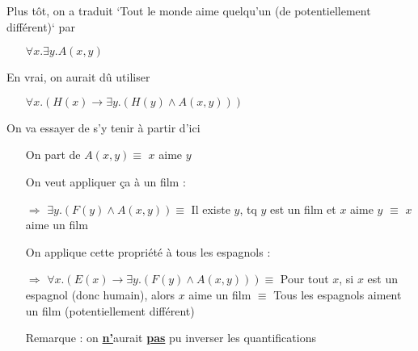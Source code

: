 	
\begin{frame}

Plus tôt, on a traduit `Tout le monde aime quelqu'un (de potentiellement différent)` par 

\begin{itemize}
\item[] $\forall x. \exists y. A(x,y)$\pause
\end{itemize}
\vspace{1mm}
En vrai, on aurait dû utiliser 
\begin{itemize}
\item[] $\forall x. (H(x) \rightarrow \exists y. (H(y) \wedge A(x,y)))$\pause
\end{itemize}
\vspace{3mm}
On va essayer de s'y tenir à partir d'ici

\end{frame}
	
	
\begin{frame}

\pause
{}\pause\newline


\begin{itemize}
\item[] On part de $A(x,y) \equiv $ $x$ aime $y$\pause
\end{itemize}
\vspace{1mm}
\begin{itemize}
\item[] On veut appliquer ça à un film : \pause
\item[$\Rightarrow$] $\exists y. (F(y) \wedge A(x,y)) \equiv $ Il existe $y$, tq $y$ est un film et $x$ aime $y$ \pause $\equiv$ $x$ aime un film\pause
\end{itemize}
\vspace{1mm}
\begin{itemize}
\item[] On applique cette propriété à tous les espagnols : \pause
\item[$\Rightarrow$] $\forall x. (E(x) \rightarrow \exists y. (F(y) \wedge A(x,y))) \equiv  $ Pour tout $x$, si $x$ est un espagnol (donc humain), alors $x$ aime un film \pause $\equiv$ Tous les espagnols aiment un film (potentiellement différent)\pause
\end{itemize}
\vspace{1mm}
\begin{itemize}
\item[] Remarque : on \textbf{\underline{n'}}aurait \textbf{\underline{pas}} pu inverser les quantifications
\end{itemize}
\end{frame}
	


